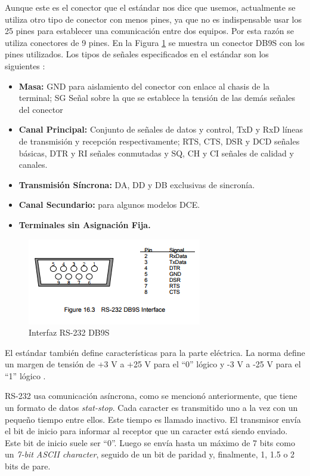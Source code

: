 \documentclass[a4paper,12pt]{article}
\begin{document}
\begin{enumerate}
  Aunque este es el conector que el estándar nos dice que usemos, actualmente
  se utiliza otro tipo de conector con menos pines, ya que no es indispensable
  usar los 25 pines para establecer una comunicación entre dos equipos. Por esta razón
  se utiliza conectores de 9 pines. En la Figura \ref{fig:db9} se muestra un conector
  DB9S con los pines utilizados. Los tipos de señales especificados en el estándar
  son los siguientes \cite{serialstandars}:
  \begin{itemize}
   \item \textbf{Masa:} GND para aislamiento del conector con enlace al chasis de la terminal; SG Señal sobre la que se establece la tensión de las demás señales del conector
   \item \textbf{Canal Principal:} Conjunto de señales de datos y control, TxD y RxD líneas de transmisión y recepción 
   respectivamente; RTS, CTS, DSR y DCD señales básicas, DTR y RI señales conmutadas y SQ, CH y CI señales de calidad y canales.
   \item \textbf{Transmisión Síncrona:}  DA, DD y DB exclusivas de sincronía.
   \item \textbf{Canal Secundario:} para algunos modelos DCE.
   \item \textbf{Terminales sin Asignación Fija.}
  \end{itemize}

  \begin{figure}
   \centering
   \includegraphics[scale = 0.6]{1.png}
   \caption{Interfaz RS-232 DB9S \cite{rs232}}
   \label{fig:db9}
  \end{figure}
  
  El estándar también define características para la parte eléctrica. La norma define
  un margen de tensión de +3 V a +25 V para el ``0'' lógico y -3 V a -25 V para el ``1'' lógico \cite{rs232}. \par
  
  RS-232 usa comunicación asíncrona, como se mencionó anteriormente, que tiene un formato de datos
  \textit{stat-stop}. Cada caracter es transmitido uno a la vez con un pequeño tiempo entre ellos.
  Este tiempo es llamado inactivo. El transmisor envía el bit de inicio para informar al receptor
  que un caracter está siendo enviado. Este bit de inicio suele ser ``0''. Luego se envía hasta un máximo
  de 7 bits como un \textit{7-bit ASCII character}, seguido de un bit de paridad y, finalmente, 1, 1.5 o 2 bits de pare.
 

\end{enumerate}
\end{document}
